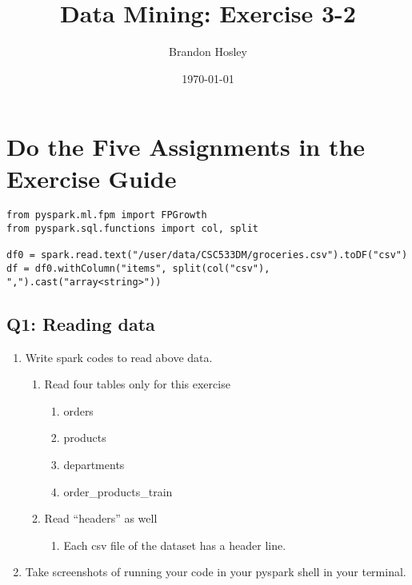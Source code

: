 \documentclass[]{article}
\title{Data Mining: Exercise 3-2}
\author{Brandon Hosley}
\date{\today}
\begin{document}
\maketitle

\section*{Do the Five Assignments in the Exercise Guide}

\begin{verbatim}
from pyspark.ml.fpm import FPGrowth
from pyspark.sql.functions import col, split

df0 = spark.read.text("/user/data/CSC533DM/groceries.csv").toDF("csv")
df = df0.withColumn("items", split(col("csv"), ",").cast("array<string>"))
\end{verbatim}

\subsection*{Q1: Reading data}
\begin{enumerate}[before=\itshape,label=\arabic*.]
	\item Write spark codes to read above data.
	\begin{enumerate}[before=\itshape,label=\alph*.]
		\item Read four tables only for this exercise
		\begin{enumerate}[before=\itshape,label=\roman*.]
			\item orders
			\item products
			\item departments
			\item order\_products\_train
		\end{enumerate}
		\item Read “headers” as well
		\begin{enumerate}[before=\itshape,label=\roman*.]
			\item Each csv file of the dataset has a header line.
		\end{enumerate}
	\end{enumerate}
	\item Take screenshots of running your code in your pyspark shell in your terminal.
\end{enumerate} 
\end{document}
